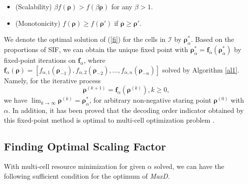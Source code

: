 \documentclass[10pt,journal,final,finalsubmission,twocolumn]{IEEEtran}
\begin{document}
\begin{itemize}

\item (Scalability) $\beta f\left(\boldsymbol{\rho}\right)> f\left(\beta\boldsymbol{\rho}\right)$ for any $\beta>1$.

\item (Monotonicity) $f\left(\boldsymbol{\rho}\right) \geq f\left(\boldsymbol{\rho}'\right)$ if $\boldsymbol{\rho} \geq \boldsymbol{\rho}'$.

\end{itemize}

We denote the optimal solution of (\ref{fi}) for the cells in $ \mathcal{I}$ by $\boldsymbol{\rho}^*_\alpha $. Based on the proportions of SIF, we can obtain the unique fixed point with 
$\boldsymbol{\rho}^* _\alpha= \boldsymbol{f}_\alpha \left(\boldsymbol{\rho}^*_\alpha\right)$ by fixed-point iterations on $\boldsymbol{f}_\alpha$, where $\boldsymbol{f}_\alpha\left(\boldsymbol{\rho}\right) = \left[ f_{\alpha,1}\left(\boldsymbol{\rho}_{-1}\right), f_{\alpha,2}\left(\boldsymbol{\rho}_{-2}\right), ..., f_{\alpha,n}\left(\boldsymbol{\rho}_{-n}\right)\right]$ solved by Algorithm \ref{al1}. Namely, for the iterative process 
\begin{equation}\label{iteration}
\boldsymbol{\rho}^{(k+1)} =\boldsymbol{f}_\alpha\left(\boldsymbol{\rho}^{(k)}\right), k\geq0,
\end{equation}
we have $\lim_{k\rightarrow \infty }\boldsymbol{\rho}^{(k)}=\boldsymbol{\rho}^*_\alpha$, for arbitrary non-negative staring point $\boldsymbol{\rho}^{(0)}$ with $\alpha$. In addition, it has been proved that the decoding order indicator obtained by this fixed-point method is optimal to multi-cell optimization problem \cite[Lemma 3]{You2}.


\subsection{Finding Optimal Scaling Factor}\label{bisection}

 With multi-cell resource minimization for given $\alpha$ solved, we can have the following sufficient condition for the optimum of {\em MaxD}.
  
\end{document}
